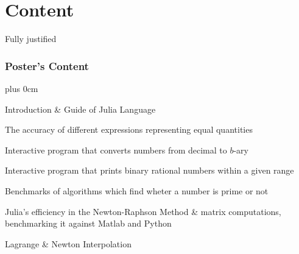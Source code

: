 \documentclass[slidestop,compress,mathserif]{beamer}
\renewcommand{\raggedright}{\leftskip=0pt \rightskip=0pt plus 0cm}
\begin{document}
\section{Content} 


\begin{frame}{Fully justified}
\frametitle{Poster's Content}

\raggedright
\vfill
	\begin{itemize}
		{\footnotesize
		\setlength{\itemsep}{5mm}
        \item Introduction \& Guide of Julia Language
		\item The accuracy of different expressions representing equal quantities
		\item Interactive program that converts numbers from decimal to $b$-ary
		\item Interactive program that prints binary rational numbers within a given range
		\item Benchmarks of algorithms which find wheter a number is prime or not 
		\item  Julia's efficiency in the Newton-Raphson Method \& matrix computations, benchmarking it against Matlab and Python
        \item Lagrange \& Newton Interpolation
	 	 }
	\end{itemize}
	\vfill
\end{frame}

\end{document}
